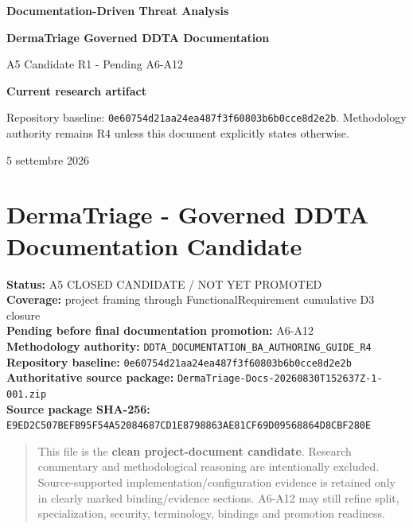 \documentclass[11pt,a4paper]{article}
\begin{document}
\begin{titlepage}
\thispagestyle{empty}
\vspace*{10mm}
{\sffamily\bfseries\color{DDTANavy}\fontsize{15}{18}\selectfont Documentation-Driven Threat Analysis}\par
\vspace{5mm}
{\sffamily\bfseries\color{DDTANavy}\fontsize{27}{31}\selectfont DermaTriage Governed DDTA Documentation}\par
\vspace{2mm}
{\sffamily\color{DDTABlue}\fontsize{17}{21}\selectfont A5 Candidate R1 - Pending A6-A12}\par
\vspace{10mm}
\begin{tcolorbox}[enhanced,arc=3pt,boxrule=0pt,colback=DDTANavy,left=12pt,right=12pt,top=10pt,bottom=10pt]
{\color{white}\sffamily\bfseries Current research artifact}\par
{\color{white!88}\small Repository baseline: \texttt{0e60754d21aa24ea487f3f60803b6b0cce8d2e2b}. Methodology authority remains R4 unless this document explicitly states otherwise.}
\end{tcolorbox}
\vfill
{\sffamily\small\color{DDTAGray} 5 settembre 2026}
\end{titlepage}
\tableofcontents
\clearpage
\section{DermaTriage - Governed DDTA Documentation
Candidate}\label{dermatriage---governed-ddta-documentation-candidate}

\textbf{Status:} A5 CLOSED CANDIDATE / NOT YET PROMOTED\\
\textbf{Coverage:} project framing through FunctionalRequirement
cumulative D3 closure\\
\textbf{Pending before final documentation promotion:} A6-A12\\
\textbf{Methodology authority:}
\texttt{DDTA\_DOCUMENTATION\_BA\_AUTHORING\_GUIDE\_R4}\\
\textbf{Repository baseline:}
\texttt{0e60754d21aa24ea487f3f60803b6b0cce8d2e2b}\\
\textbf{Authoritative source package:}
\texttt{DermaTriage-Docs-20260830T152637Z-1-001.zip}\\
\textbf{Source package SHA-256:}
\texttt{E9ED2C507BEFB95F54A52084687CD1E8798863AE81CF69D09568864D8CBF280E}

\begin{quote}
This file is the \textbf{clean project-document candidate}. Research
commentary and methodological reasoning are intentionally excluded.
Source-supported implementation/configuration evidence is retained only
in clearly marked binding/evidence sections. A6-A12 may still refine
split, specialization, security, terminology, bindings and promotion
readiness.
\end{quote}
\end{document}
